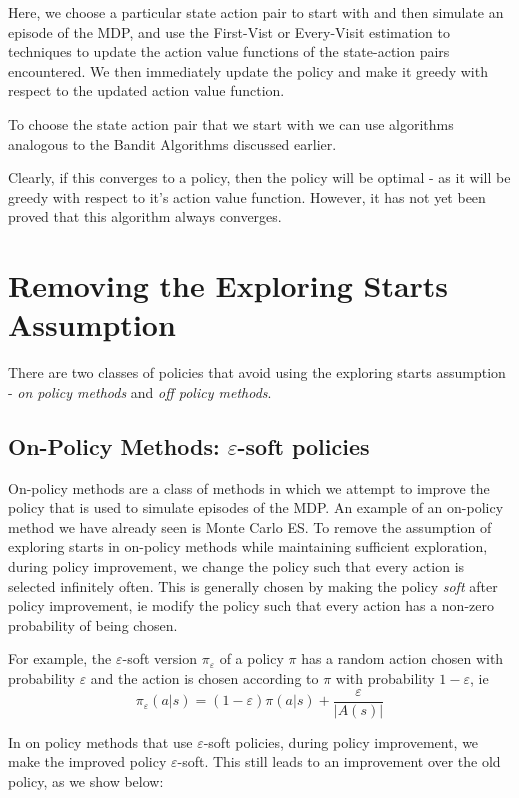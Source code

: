 \documentclass[12pt]{report}
\begin{document}
Here, we choose a particular state action pair to start with and then simulate an episode of the MDP, and use the First-Vist or Every-Visit estimation to techniques to update the action value functions of the state-action pairs encountered. We then immediately update the policy and make it greedy with respect to the updated action value function. 

To choose the state action pair that we start with we can use algorithms analogous to the Bandit Algorithms discussed earlier.

Clearly, if this converges to a policy, then the policy will be optimal - as it will be greedy with respect to it's action value function. However, it has not yet been proved that this algorithm always converges.

\section{Removing the Exploring Starts Assumption}
There are two classes of policies that avoid using the exploring starts assumption - \textit{on policy methods} and \textit{off policy methods}.
\subsection{\texorpdfstring{On-Policy Methods: $\varepsilon$-soft policies}{}}
On-policy methods are a class of methods in which we attempt to improve the policy that is used to simulate episodes of the MDP. An example of an on-policy method we have already seen is Monte Carlo ES. To remove the assumption of exploring starts in on-policy methods while maintaining sufficient exploration, during policy improvement, we change the policy such that every action is selected infinitely often. This is generally chosen by making the policy \textit{soft} after policy improvement, ie modify the policy such that every action has a non-zero probability of being chosen. 

For example, the $\varepsilon$-soft version $\pi_{\varepsilon}$ of a policy $\pi$ has a random action chosen with probability $\varepsilon$ and the action is chosen according to $\pi$ with probability $1 - \varepsilon$, ie
\begin{equation}
    \pi_{\varepsilon}(a | s) = (1 - \varepsilon)\pi(a | s) + \frac{\varepsilon}{\left|A(s)\right|}
\end{equation}

In on policy methods that use $\varepsilon$-soft policies, during policy improvement, we make the improved policy $\varepsilon$-soft. This still leads to an improvement over the old policy, as we show below:
\end{document}
